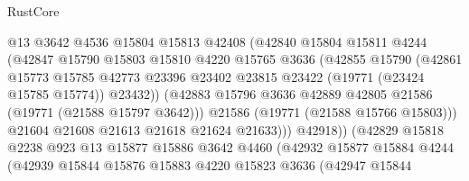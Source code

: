 \begin{lexlean}{RustCore}
\begin{coremodule}
                              @13
                              @3642
                              @4536
                              @15804
                              @15813
                              @42408
                              (@42840
                                @15804
                                @15811
                                @4244
                                (@42847
                                  @15790
                                  @15803
                                  @15810
                                  @4220
                                  @15765
                                  @3636
                                  (@42855
                                    @15790
                                    (@42861
                                      @15773
                                      @15785
                                      @42773
                                      @23396
                                      @23402
                                      @23815
                                      @23422
                                      (@19771 (@23424 @15785 @15774))
                                      @23432))
                                  (@42883
                                    @15796
                                    @3636
                                    @42889
                                    @42805
                                    @21586
                                    (@19771 (@21588 @15797 @3642)))
                                  @21586
                                  (@19771 (@21588 @15766 @15803)))
                                @21604
                                @21608
                                @21613
                                @21618
                                @21624
                                @21633)))
                          @42918))
                      (@42829
                        @15818
                        @2238
                        @923
                        @13
                        @15877
                        @15886
                        @3642
                        @4460
                        (@42932
                          @15877
                          @15884
                          @4244
                          (@42939
                            @15844
                            @15876
                            @15883
                            @4220
                            @15823
                            @3636
                            (@42947
                              @15844

\end{coremodule}
\end{lexlean}
